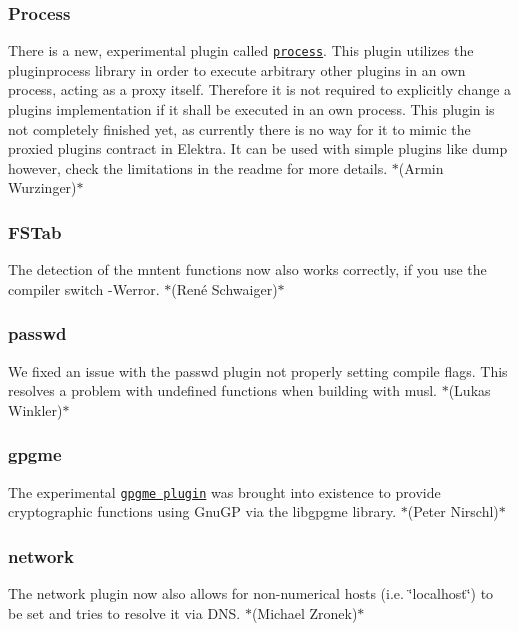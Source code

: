 \subsubsection*{Process}

There is a new, experimental plugin called \href{https://libelektra.org/plugins/process}{\tt process}. This plugin utilizes the pluginprocess library in order to execute arbitrary other plugins in an own process, acting as a proxy itself. Therefore it is not required to explicitly change a plugin\textquotesingle{}s implementation if it shall be executed in an own process. This plugin is not completely finished yet, as currently there is no way for it to mimic the proxied plugin\textquotesingle{}s contract in Elektra. It can be used with simple plugins like {\ttfamily dump} however, check the limitations in the readme for more details. $\ast$(Armin Wurzinger)$\ast$

\subsubsection*{F\+S\+Tab}

The detection of the {\ttfamily mntent} functions now also works correctly, if you use the compiler switch {\ttfamily -\/\+Werror}. $\ast$(René Schwaiger)$\ast$

\subsubsection*{passwd}

We fixed an issue with the passwd plugin not properly setting compile flags. This resolves a problem with undefined functions when building with musl. $\ast$(Lukas Winkler)$\ast$

\subsubsection*{gpgme}

The experimental \href{https://libelektra.org/plugins/gpgme}{\tt gpgme plugin} was brought into existence to provide cryptographic functions using Gnu\+GP via the {\ttfamily libgpgme} library. $\ast$(Peter Nirschl)$\ast$

\subsubsection*{network}

The {\ttfamily network} plugin now also allows for non-\/numerical hosts (i.\+e. \char`\"{}localhost\char`\"{}) to be set and tries to resolve it via D\+NS. $\ast$(Michael Zronek)$\ast$

